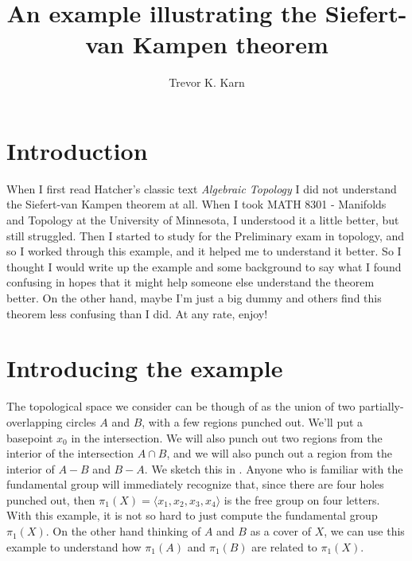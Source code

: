 \documentclass[11pt]{amsart}
\title{An example illustrating the Siefert-van Kampen theorem}
\author{Trevor K. Karn}
\begin{document}
\maketitle

\section{Introduction}

When I first read Hatcher's classic text \textit{Algebraic Topology} I did not understand the Siefert-van Kampen theorem at all. When I took MATH 8301 - Manifolds and Topology at the University of Minnesota, I understood it a little better, but still struggled. Then I started to study for the Preliminary exam in topology, and so I worked through this example, and it helped me to understand it better. So I thought I would write up the example and some background to say what I found confusing in hopes that it might help someone else understand the theorem better. On the other hand, maybe I'm just a big dummy and others find this theorem less confusing than I did. 
At any rate, enjoy!

\section{Introducing the example}

The topological space we consider can be though of as the union of two partially-overlapping circles $A$ and $B$, with a few regions punched out. We'll put a basepoint $x_0$ in the intersection. We will also punch out two regions from the interior of the intersection $A \cap B$, and we will also punch out a region from the interior of $A-B$ and $B-A$. We sketch this in . 
Anyone who is familiar with the fundamental group will immediately recognize that, since there are four holes punched out, then $\pi_1(X) = \langle x_1, x_2, x_3, x_4 \rangle$ is the free group on four letters. With this example, it is not so hard to just compute the fundamental group $\pi_1(X)$. On the other hand thinking of $A$ and $B$ as a cover of $X$, we can use this example to understand how $\pi_1(A)$ and $\pi_1(B)$ are related to $\pi_1(X)$. 
\end{document}
